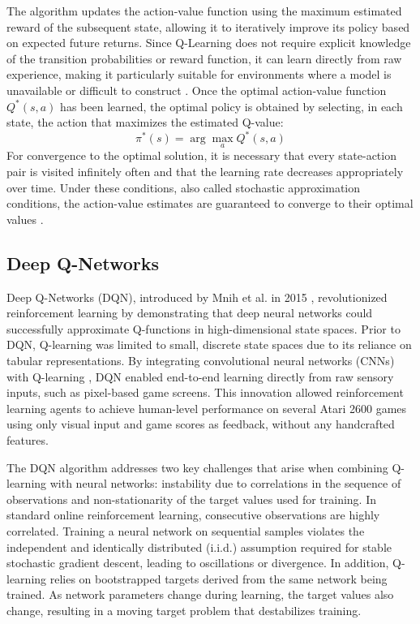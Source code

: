 \documentclass[12pt,a4paper]{report}
\begin{document}
The algorithm updates the action-value function using the maximum estimated reward of the subsequent state, allowing it to iteratively improve its policy based on expected future returns.
Since Q-Learning does not require explicit knowledge of the transition probabilities or reward function, it can learn directly from raw experience, making it particularly suitable for environments where a model is unavailable or difficult to construct \cite{chiave4}. Once the optimal action-value function $Q^*(s,a)$ has been learned, the optimal policy is obtained by selecting, in each state, the action that maximizes the estimated Q-value:
\[
\pi^*(s) = \arg\max_{a} Q^*(s, a)
\]
For convergence to the optimal solution, it is necessary that every state-action pair is visited infinitely often and that the learning rate decreases appropriately over time. Under these conditions, also called stochastic approximation conditions, the action-value estimates are guaranteed to converge to their optimal values \cite{chiave48}.

\subsection{Deep Q-Networks}
Deep Q-Networks (DQN), introduced by Mnih et al. in 2015 \cite{chiave7}, revolutionized reinforcement learning by demonstrating that deep neural networks could successfully approximate Q-functions in high-dimensional state spaces. 
Prior to DQN, Q-learning was limited to small, discrete state spaces due to its reliance on tabular representations. By integrating convolutional neural networks (CNNs) with Q-learning \cite{chiave7}, DQN enabled end-to-end learning directly from raw sensory inputs, such as pixel-based game screens. This innovation allowed reinforcement learning agents to achieve human-level performance on several Atari 2600 games using only visual input and game scores as feedback, without any handcrafted features.

The DQN algorithm addresses two key challenges that arise when combining Q-learning with neural networks: instability due to correlations in the sequence of observations and non-stationarity of the target values used for training.
In standard online reinforcement learning, consecutive observations are highly correlated. Training a neural network on sequential samples violates the independent and identically distributed (i.i.d.) assumption required for stable stochastic gradient descent, leading to oscillations or divergence. In addition, Q-learning relies on bootstrapped targets derived from the same network being trained. As network parameters change during learning, the target values also change, resulting in a moving target problem that destabilizes training.
\end{document}
